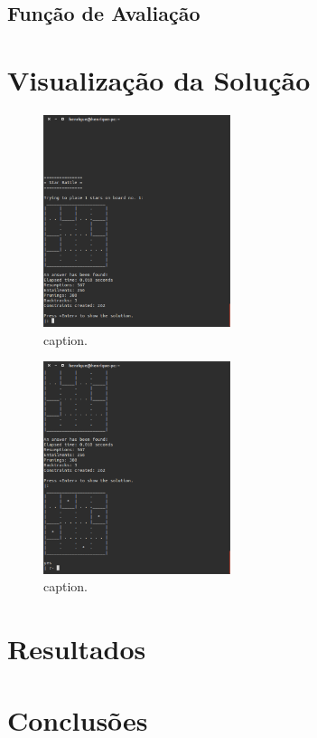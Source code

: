 \documentclass[runningheads,a4paper]{llncs}
\begin{document}
\subsection{Função de Avaliação}


\section{Visualização da Solução}

\begin{figure}
\centering
\includegraphics[height=6.2cm]{res/testBoard4x4_1}
\caption{caption.}
\label{fig:example}
\end{figure}

\begin{figure}
\centering
\includegraphics[height=6.2cm]{res/testBoard4x4_1-solution}
\caption{caption.}
\label{fig:example}
\end{figure}


\section{Resultados}

\section{Conclusões}
\end{document}
